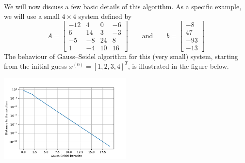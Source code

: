\documentclass[10pt,a4paper]{article}
\theoremstyle{plain}
\theoremstyle{definition}
\begin{document}
We will now discuss a few basic details of this algorithm.
As a specific example, we will use a small \(4\times 4\) system
defined by
\begin{equation}\label{44}
  A = \begin{bmatrix}
  -12& 4& 0& -6\\
  6& 14& 3& -3\\
  -5& -8& 24& 8\\
  1& -4& 10& 16
  \end{bmatrix}
  \qquad\text{and}\qquad
  b = \begin{bmatrix}-8\\47\\-93\\-13\end{bmatrix}
\end{equation}
The behaviour of Gauss--Seidel algorithm for this (very small) system, starting from the initial guess \(x^{(0)} = [1,2,3,4]^T\), is illustrated in the figure below.
\begin{center}
  \includegraphics[width=0.5\textwidth]{gs44.pdf}
\end{center}
\end{document}
